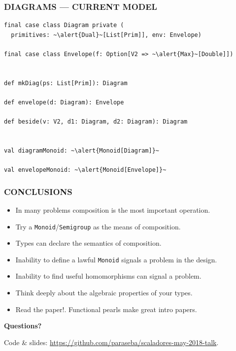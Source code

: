 \documentclass{beamer}
\begin{document}
\begin{frame}[fragile] \frametitle{DIAGRAMS --- CURRENT MODEL}
  \begin{block}{}
  \begin{lstlisting}
final case class Diagram private (
  primitives: ~\alert{Dual}~[List[Prim]], env: Envelope)

final case class Envelope(f: Option[V2 => ~\alert{Max}~[Double]])


def mkDiag(ps: List[Prim]): Diagram

def envelope(d: Diagram): Envelope

def beside(v: V2, d1: Diagram, d2: Diagram): Diagram


val diagramMonoid: ~\alert{Monoid[Diagram]}~

val envelopeMonoid: ~\alert{Monoid[Envelope]}~
  \end{lstlisting}
  \vspace{-0.5cm}
  \end{block}
\end{frame}

\begin{frame} \frametitle{CONCLUSIONS}
  \begin{itemize}
    \item In many problems \alert{composition is the most important operation.}
    \item Try a \texttt{Monoid}/\texttt{Semigroup} as the means of composition.
    \item \alert{Types} can declare the \alert{semantics of composition.}
    \item Inability to define a lawful \texttt{Monoid} signals a problem in
        the design.
    \item Inability to find useful homomorphisms can signal a problem.
    \item Think deeply about the algebraic properties of your types.
    \item \alert{Read the paper!.} Functional pearls make great intro papers.
  \end{itemize}

  \begin{block}{}
    \centering
    \bf
    \Huge{Questions?}
  \end{block}

  Code \& slides: \href{https://github.com/paraseba/scaladores-may-2018-talk}{https://github.com/paraseba/scaladores-may-2018-talk}.

\end{frame}
\end{document}
